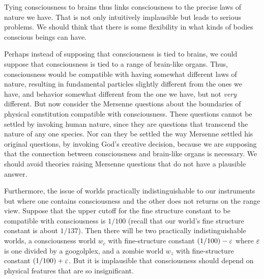 Tying consciousness to brains thus links consciousness to the precise laws of nature we have. That is not only intuitively implausible
but leads to serious problems. We should think that there is some flexibility in what kinds of bodies conscious beings can have.

Perhaps instead of supposing that consciousness is tied to brains, we could suppose that consciousness is tied to a range of brain-like
organs. Thus, consciousness would be compatible with having somewhat different laws of nature, resulting in fundamental particles
slightly different from the ones we have, and behavior somewhat different from the one we have, but not \textit{very} different.
But now consider the Mersenne questions about the boundaries of physical constitution compatible with consciousness. These
questions cannot be settled by invoking human nature, since they are questions that transcend the nature of any one species.
Nor can they be settled the way Mersenne settled his original questions, by invoking God's creative decision, because we are
supposing that the connection between consciousness and brain-like organs is necessary. We should avoid theories raising Mersenne questions that
do not have a plausible answer. 

Furthermore, the issue of worlds practically indistinguishable to our instruments but where one contains consciousness and the other
does not returns on the range view. Suppose that the upper cutoff for the fine structure constant to be compatible with
consciousness is $1/100$ (recall that our world's fine structure constant is about $1/137$). 
Then there will be two practically indistinguishable worlds, a consciousness world $w_c$ with fine-structure constant $(1/100)-\varepsilon$ where
$\varepsilon$ is one divided by a googolplex, and a zombie world $w_z$ with fine-structure constant $(1/100)+\varepsilon$.
But it is implausible that consciousness should depend on physical features that are so insignificant.

